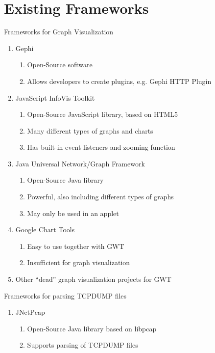 \documentclass{beamer}
\begin{document}
\section{Existing Frameworks}

\begin{frame}{Frameworks for Graph Visualization}

  \begin{enumerate}
    \item Gephi
      \begin{enumerate}
	\item Open-Source software
	\item Allows developers to create plugins, e.g. Gephi HTTP Plugin
      \end{enumerate}
    \item JavaScript InfoVis Toolkit
      \begin{enumerate}
	\item Open-Source JavaScript library, based on HTML5
	\item Many different types of graphs and charts
	\item Has built-in event listeners and zooming function
      \end{enumerate}
    \item Java Universal Network/Graph Framework
      \begin{enumerate}
	\item Open-Source Java library
	\item Powerful, also including different types of graphs
	\item May only be used in an applet
      \end{enumerate}
    \item Google Chart Tools
      \begin{enumerate}
	\item Easy to use together with GWT
	\item Insufficient for graph visualization
      \end{enumerate}
     \item Other ``dead'' graph visualization projects for GWT
 \end{enumerate}
\end{frame}

\begin{frame}{Frameworks for parsing TCPDUMP files }
  \begin{enumerate}
   \item JNetPcap 
      \begin{enumerate}
	\item Open-Source Java library based on libpcap
	\item Supports parsing of TCPDUMP files
      \end{enumerate}  
  \end{enumerate}
\end{frame}
\end{document}
